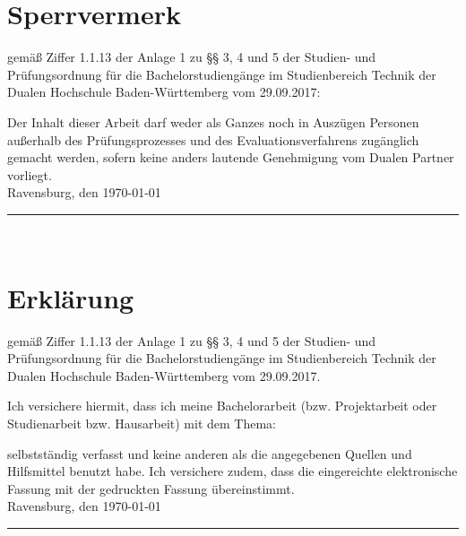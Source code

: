 
\chapter*{Sperrvermerk} 
gemäß Ziffer 1.1.13 der Anlage 1 zu §§ 3, 4 und 5  der Studien- und Prüfungsordnung für die Bachelorstudiengänge im Studienbereich Technik der Dualen 
Hochschule Baden-Württemberg vom 29.09.2017:

Der Inhalt dieser Arbeit darf weder als Ganzes noch in Auszügen Personen außerhalb des Prüfungsprozesses und des Evaluationsverfahrens zugänglich gemacht 
werden, sofern keine anders lautende Genehmigung vom Dualen Partner vorliegt.\\[6ex]

Ravensburg, den \today \\[4ex]

\rule[-0.2cm]{5cm}{0.5pt}

\autor \\[10ex]

\chapter*{Erklärung} 

gemäß Ziffer 1.1.13 der Anlage 1 zu §§ 3, 4 und 5  der Studien- und Prüfungsordnung für die Bachelorstudiengänge im Studienbereich Technik der Dualen 
Hochschule Baden-Württemberg vom 29.09.2017.

Ich versichere hiermit, dass ich meine Bachelorarbeit (bzw. Projektarbeit oder Studienarbeit bzw. Hausarbeit) mit dem Thema:

\begin{quote}
	\textit{\titel} %
\end{quote}

selbstständig verfasst und keine anderen als die angegebenen Quellen und Hilfsmittel benutzt habe. Ich versichere zudem, dass die eingereichte elektronische 
Fassung mit der gedruckten Fassung übereinstimmt.\\[6ex]

Ravensburg, den \today \\[1ex]

\rule[-0.2cm]{5cm}{0.5pt}

\autor \\[10ex]

\rmfamily


